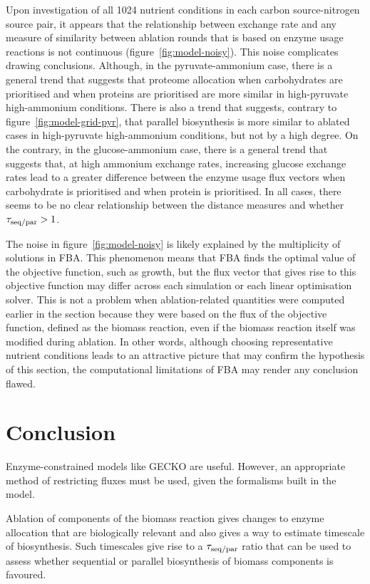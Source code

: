 Upon investigation of all \num{1024} nutrient conditions in each carbon source-nitrogen source pair, it appears that the relationship between exchange rate and any measure of similarity between ablation rounds that is based on enzyme usage reactions is not continuous (figure~\ref{fig:model-noisy}).
This noise complicates drawing conclusions.
Although, in the pyruvate-ammonium case, there is a general trend that suggests that proteome allocation when carbohydrates are prioritised and when proteins are prioritised are more similar in high-pyruvate high-ammonium conditions.
There is also a trend that suggests, contrary to figure~\ref{fig:model-grid-pyr}, that parallel biosynthesis is more similar to ablated cases in high-pyruvate high-ammonium conditions, but not by a high degree.
On the contrary, in the glucose-ammonium case, there is a general trend that suggests that, at high ammonium exchange rates, increasing glucose exchange rates lead to a greater difference between the enzyme usage flux vectors when carbohydrate is prioritised and when protein is prioritised.
In all cases, there seems to be no clear relationship between the distance measures and whether $\tau_{\mathrm{seq}/\mathrm{par}} > 1$.

The noise in figure~\ref{fig:model-noisy} is likely explained by the multiplicity of solutions in FBA.
This phenomenon means that FBA finds the optimal value of the objective function, such as growth, but the flux vector that gives rise to this objective function may differ across each simulation or each linear optimisation solver.
This is not a problem when ablation-related quantities were computed earlier in the section because they were based on the flux of the objective function, defined as the biomass reaction, even if the biomass reaction itself was modified during ablation.
In other words, although choosing representative nutrient conditions leads to an attractive picture that may confirm the hypothesis of this section, the computational limitations of FBA may render any conclusion flawed.


\section{Conclusion}
\label{subsec:model-conclusion}

Enzyme-constrained models like GECKO are useful.
However, an appropriate method of restricting fluxes must be used, given the formalisms built in the model.

Ablation of components of the biomass reaction gives changes to enzyme allocation that are biologically relevant and also gives a way to estimate timescale of biosynthesis.
Such timescales give rise to a $\tau_{\mathrm{seq}/\mathrm{par}}$ ratio that can be used to assess whether sequential or parallel biosynthesis of biomass components is favoured.


